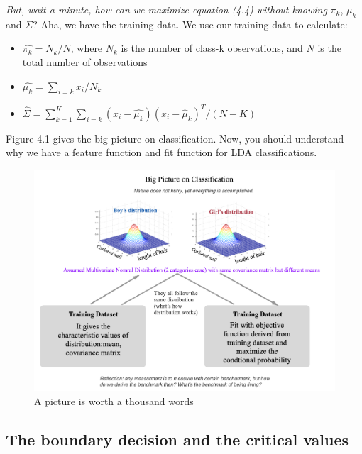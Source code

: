 \documentclass[12pt]{article}
\theoremstyle{definition}
\numberwithin{equation}{section}
\numberwithin{figure}{section}
\numberwithin{table}{section}
\begin{document}
\textit{But, wait a minute, how can we maximize equation (4.4) without knowing} $\pi_k$, $\mu_k$ and $\Sigma$? Aha, we have the training data. We use our training data to calculate:
\begin{itemize}
	\item $\hat{\pi_k} = N_k/N$, where $N_k$ is the number of class-k observations, and $N$ is the total number of observations
	\item $\hat{\mu_k} = \sum_{i=k} x_i/N_k$
	\item $\hat{\Sigma} = \sum_{k=1}^K \sum_{i=k} (x_i - \hat{\mu_k})(x_i - \hat{\mu}_k)^T/(N-K)$
\end{itemize}

Figure 4.1 gives the big picture on classification. Now, you should understand why we have a feature function and fit function for LDA classifications. 
\begin{figure}[H]
	\centering
	\includegraphics[width=\textwidth]{bigpicture}
	\caption{A picture is worth a thousand words}
\end{figure}

\subsection{The boundary decision and the critical values}
\end{document}

